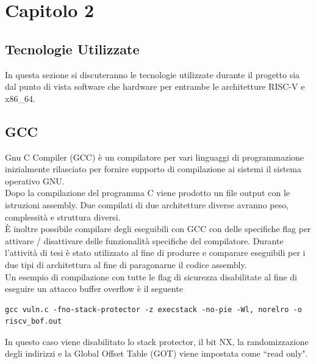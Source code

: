 \chapter*{Capitolo 2}

\section*{Tecnologie Utilizzate}
In questa sezione si discuteranno le tecnologie utilizzate durante il progetto sia dal punto di vista software che hardware per entrambe le architetture RISC-V e x86\_64.

\section*{GCC}
Gnu C Compiler (GCC) \cite{GCC} è un compilatore per vari linguaggi di programmazione inizialmente rilasciato per fornire supporto di compilazione ai sistemi il sistema operativo GNU.\\
Dopo la compilazione del programma C viene prodotto un file output con le istruzioni assembly. Due compilati di due architetture diverse avranno peso, complessità e struttura diversi.\\
\newline
È inoltre possibile compilare degli eseguibili con GCC con delle specifiche flag per attivare / disattivare delle funzionalità specifiche del compilatore. Durante l'attività di tesi è stato utilizzato al fine di produrre e comparare eseguibili per i due tipi di architettura al fine di paragonarne il codice assembly.\\
Un esempio di compilazione con tutte le flag di sicurezza disabilitate al fine di eseguire un attacco buffer overflow è il seguente
\begin{verbatim}
gcc vuln.c -fno-stack-protector -z execstack -no-pie -Wl, norelro -o riscv_bof.out
\end{verbatim}
In questo caso viene disabilitato lo stack protector, il bit NX, la randomizzazione degli indirizzi e la Global Offset Table (GOT) \cite{CTF101got} viene impostata come ``read only".
